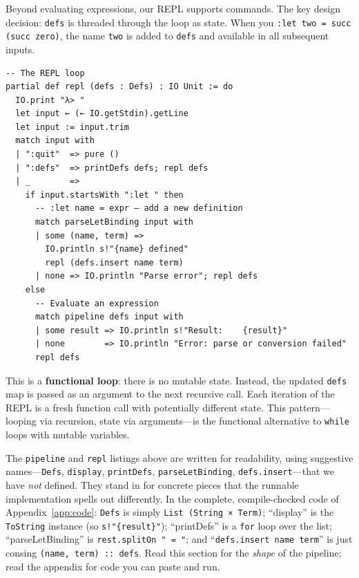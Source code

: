 \documentclass[11pt,a4paper]{article}
\theoremstyle{definition}
\begin{document}
Beyond evaluating expressions, our REPL supports commands. The key design
decision: \texttt{defs} is threaded through the loop as state. When you
\texttt{:let two = succ (succ zero)}, the name \texttt{two} is added to
\texttt{defs} and available in all subsequent inputs.

\begin{verbatim}
-- The REPL loop
partial def repl (defs : Defs) : IO Unit := do
  IO.print "λ> "
  let input ← (← IO.getStdin).getLine
  let input := input.trim
  match input with
  | ":quit"  => pure ()
  | ":defs"  => printDefs defs; repl defs
  | _        =>
    if input.startsWith ":let " then
      -- :let name = expr — add a new definition
      match parseLetBinding input with
      | some (name, term) =>
        IO.println s!"{name} defined"
        repl (defs.insert name term)
      | none => IO.println "Parse error"; repl defs
    else
      -- Evaluate an expression
      match pipeline defs input with
      | some result => IO.println s!"Result:    {result}"
      | none        => IO.println "Error: parse or conversion failed"
      repl defs
\end{verbatim}

This is a \textbf{functional loop}: there is no mutable state. Instead, the
updated \texttt{defs} map is passed as an argument to the next recursive call.
Each iteration of the REPL is a fresh function call with potentially different
state. This pattern---looping via recursion, state via arguments---is the
functional alternative to \texttt{while} loops with mutable variables.

\begin{warning}
The \texttt{pipeline} and \texttt{repl} listings above are written for
readability, using suggestive names---\texttt{Defs}, \texttt{display},
\texttt{printDefs}, \texttt{parseLetBinding}, \texttt{defs.insert}---that we
have \emph{not} defined. They stand in for concrete pieces that the runnable
implementation spells out differently. In the complete, compile-checked code
of Appendix~\ref{app:code}: \texttt{Defs} is simply
\texttt{List (String × Term)}; ``display'' is the \texttt{ToString} instance
(so \texttt{s!"\{result\}"}); ``printDefs'' is a \texttt{for} loop over the
list; ``parseLetBinding'' is \texttt{rest.splitOn " = "}; and
``\texttt{defs.insert name term}'' is just consing \texttt{(name, term) ::
defs}. Read this section for the \emph{shape} of the pipeline; read the
appendix for code you can paste and run.
\end{warning}
\end{document}
